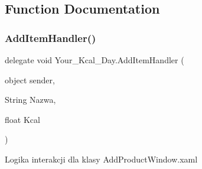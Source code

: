 \subsection{Function Documentation}
\mbox{\label{namespace_your___kcal___day_a544d00dcbc6dc192f292015082379618}} 
\subsubsection{\texorpdfstring{AddItemHandler()}{AddItemHandler()}}
{\footnotesize\ttfamily delegate void Your\+\_\+\+Kcal\+\_\+\+Day.\+Add\+Item\+Handler (\begin{DoxyParamCaption}\item[{object}]{sender,  }\item[{String}]{Nazwa,  }\item[{float}]{Kcal }\end{DoxyParamCaption})}



Logika interakcji dla klasy Add\+Product\+Window.\+xaml 

